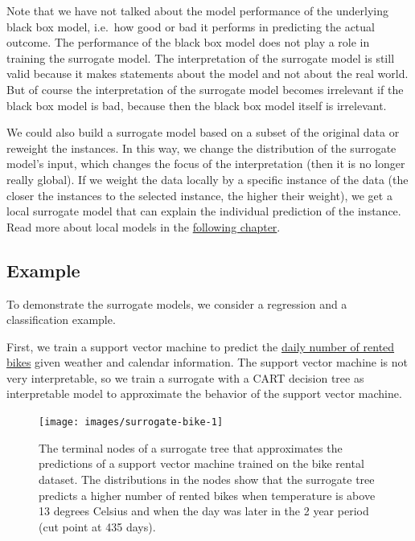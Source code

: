 \documentclass[
  12pt,
]{krantz}
\begin{document}
Note that we have not talked about the model performance of the underlying black box model, i.e.~how good or bad it performs in predicting the actual outcome.
The performance of the black box model does not play a role in training the surrogate model.
The interpretation of the surrogate model is still valid because it makes statements about the model and not about the real world.
But of course the interpretation of the surrogate model becomes irrelevant if the black box model is bad, because then the black box model itself is irrelevant.

We could also build a surrogate model based on a subset of the original data or reweight the instances.
In this way, we change the distribution of the surrogate model's input, which changes the focus of the interpretation (then it is no longer really global).
If we weight the data locally by a specific instance of the data (the closer the instances to the selected instance, the higher their weight), we get a local surrogate model that can explain the individual prediction of the instance.
Read more about local models in the \protect\hyperlink{lime}{following chapter}.

\hypertarget{example-3}{%
\subsection{Example}\label{example-3}}

To demonstrate the surrogate models, we consider a regression and a classification example.

First, we train a support vector machine to predict the \protect\hyperlink{bike-data}{daily number of rented bikes} given weather and calendar information.
The support vector machine is not very interpretable, so we train a surrogate with a CART decision tree as interpretable model to approximate the behavior of the support vector machine.

\begin{figure}

{\centering \texttt{[image: images/surrogate-bike-1]} 

}

\caption{The terminal nodes of a surrogate tree that approximates the predictions of a support vector machine trained on the bike rental dataset. The distributions in the nodes show that the surrogate tree predicts a higher number of rented bikes when temperature is above 13 degrees Celsius and when the day was later in the 2 year period (cut point at 435 days).}\label{fig:surrogate-bike}
\end{figure}
\end{document}
